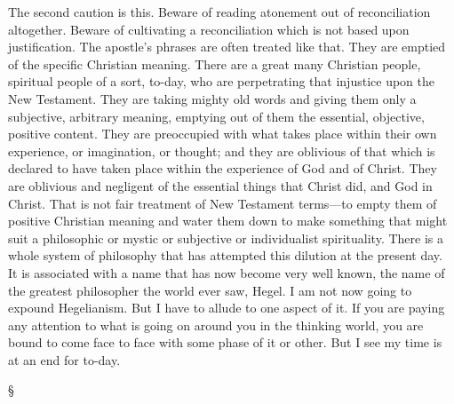 \documentclass[12pt,letterpaper,oneside]{book}
\begin{document}
The second caution is this. Beware of reading 
atonement out of reconciliation altogether. 
Beware of cultivating a reconciliation which is 
not based upon justification. The apostle's 
phrases are often treated like that. They are 
emptied of the specific Christian meaning. 
There are a great many Christian people, 
spiritual people of a sort, to-day, who are 
perpetrating that injustice upon the New 
Testament. They are taking mighty old words 
and giving them only a subjective, arbitrary 
meaning, emptying out of them the essential, 
objective, positive content. They are preoccupied 
with what takes place within their 
own experience, or imagination, or thought; 
and they are oblivious of that which is 
declared to have taken place within the experience 
of God and of Christ. They are 
oblivious and negligent of the essential things 
that Christ did, and God in Christ. That is 
not fair treatment of New Testament terms---to 
empty them of positive Christian meaning 
and water them down to make something 
that might suit a philosophic or mystic or 
subjective or individualist spirituality. There 
is a whole system of philosophy that has 
attempted this dilution at the present day. It 
is associated with a name that has now become 
very well known, the name of the greatest 
philosopher the world ever saw, Hegel. I am 
not now going to expound Hegelianism. But 
I have to allude to one aspect of it. If you 
are paying any attention to what is going on 
around you in the thinking world, you are 
bound to come face to face with some phase 
of it or other. But I see my time is at an end 
for to-day. 

\begin{center}
\S
\end{center}
\end{document}
